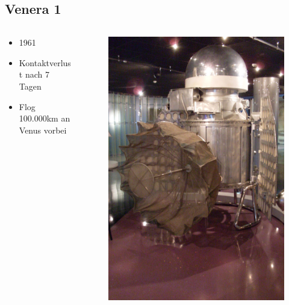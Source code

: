 \documentclass{beamer}
\begin{document}
	\subsection{Venera 1}
	\begin{frame}
		\begin{columns}
			\begin{column}{0.5\textwidth}
				\begin{itemize}
					\item 1961
					\item Kontaktverlust nach 7 Tagen
					\item Flog 100.000km an Venus vorbei
				\end{itemize}
			\end{column}
			\begin{column}{0.4\textwidth}
				\begin{figure}[ht]
					\includegraphics[scale=0.21]{./images/venera_1}
				\end{figure}
			\end{column}
		\end{columns}
	\end{frame}
\end{document}
